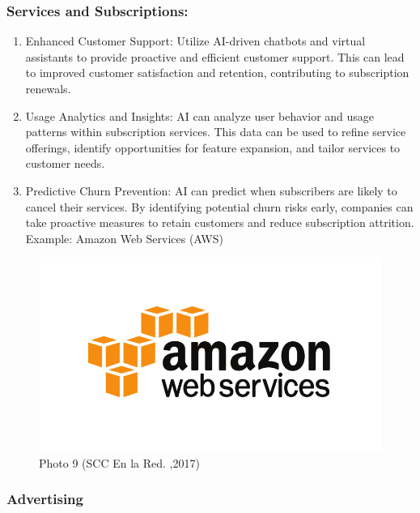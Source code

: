 \documentclass[
]{article}
\begin{document}
\hypertarget{services-and-subscriptions}{%
\subsubsection{Services and Subscriptions:}\label{services-and-subscriptions}}

\begin{enumerate}
\def\labelenumi{\arabic{enumi}.}
\item
  Enhanced Customer Support: Utilize AI-driven chatbots and virtual assistants to provide proactive and efficient customer support. This can lead to improved customer satisfaction and retention, contributing to subscription renewals.
\item
  Usage Analytics and Insights: AI can analyze user behavior and usage patterns within subscription services. This data can be used to refine service offerings, identify opportunities for feature expansion, and tailor services to customer needs.
\item
  Predictive Churn Prevention: AI can predict when subscribers are likely to cancel their services. By identifying potential churn risks early, companies can take proactive measures to retain customers and reduce subscription attrition.
  Example: Amazon Web Services (AWS)
\end{enumerate}

\begin{figure}
\centering
\includegraphics{tech2.png}
\caption{Photo 9 (SCC En la Red. ,2017)}
\end{figure}

\hypertarget{advertising}{%
\subsubsection{Advertising}\label{advertising}}
\end{document}
